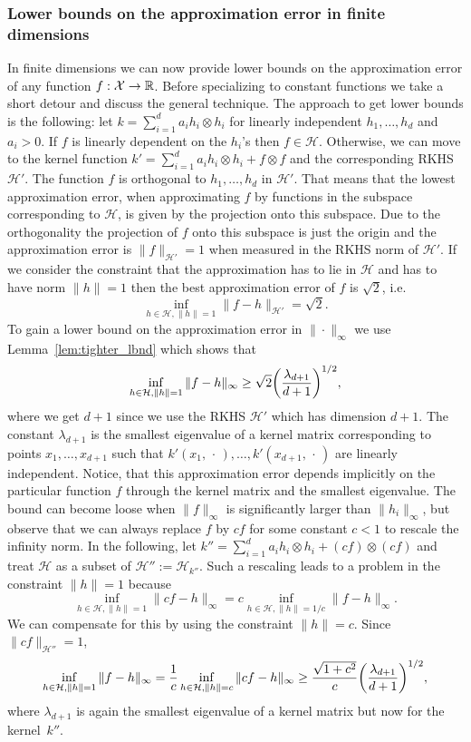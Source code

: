 \documentclass[AHL,Unicode,longabstracts,published]{cedram}
\theoremstyle{remark}
\newcommand{\R}{\mathbb{R}}
\newcommand{\X}{\mathcal{X}}
\newcommand{\cH}{\mathcal{H}}
\renewcommand*{\to}{\mathchoice{\longrightarrow}{\rightarrow}{\rightarrow}{\rightarrow}}
\let\originalleft\left
\let\originalright\right
\renewcommand{\left}{\mathopen{}\mathclose\bgroup\originalleft}
\renewcommand{\right}{\aftergroup\egroup\originalright}
\begin{document}
\subsubsection{Lower bounds on the approximation error in finite dimensions} \label{sec:finite_dim_appox_LB}
In finite dimensions we can now provide lower bounds on the approximation error of any function $f:\X \to \R$. Before specializing to constant functions we take a short detour and discuss the general technique. The approach to get lower bounds is the following: let $k = \sum_{i=1}^d a_i h_i \otimes h_i$ for linearly independent $h_1,\dots, h_d$ and $a_i>0$. If $f$ is linearly dependent on the $h_i$'s then $f \in \cH$. Otherwise, we can move to the kernel function $k' = \sum_{i=1}^d a_i h_i\otimes h_i + f\otimes f$ and the corresponding RKHS $\cH'$. The function $f$ is orthogonal to $h_1,\dots, h_d$ in $\cH'$. That means that the lowest approximation error, when approximating $f$ by functions in the subspace corresponding to $\cH$, is given by the projection onto this subspace. Due to the orthogonality the projection of $f$ onto this subspace is just the origin and the approximation error is $\|f\|_{\cH'} = 1$ when measured in the RKHS norm of $\cH'$. If we consider the constraint that the approximation has to lie in $\cH$ and has to have norm $\|h\| =1 $ then the best approximation error of $f$ is $\sqrt{2}$, i.e.
\[
\inf_{h \in \cH, \|h\|=1} \|f-h\|_{\cH'} = \sqrt{2}.
\]
To gain a lower bound on the approximation error in $\|\cdot\|_\infty$ we use Lemma~\ref{lem:tighter_lbnd} which shows that
\[
\inf_{h\in \cH, \|h\|=1} \|f-h\|_\infty \geq \sqrt{2} \left(\frac{\lambda_{d+1}}{d+1}\right)^{1/2},
\]
where we get $d+1$ since we use the RKHS $\cH'$ which has dimension $d+1$. The constant $\lambda_{d+1}$ is the smallest eigenvalue of a kernel matrix corresponding to points $x_1,\dots, x_{d+1}$ such that $k'(x_1,\,\cdot\,),\dots, k'(x_{d+1}, \,\cdot\,)$ are linearly independent. Notice, that this approximation error depends implicitly on the particular function $f$ through the kernel matrix and the smallest eigenvalue. The bound can become loose when $\|f\|_\infty$ is significantly larger than $\|h_i\|_\infty$, but observe that we can always replace $f$ by $cf$ for some constant $c<1$ to rescale the infinity norm. In the following, let $k'' = \sum_{i=1}^d a_i h_i\otimes h_i + (cf)\otimes (cf)$ and treat $\cH$ as a subset of $\cH'' := \cH_{k''}$. Such a rescaling leads to a problem in the constraint $\|h\|=1$ because
\[
\inf_{h\in \cH, \|h\|=1} \|cf-h\|_\infty = c \inf_{h\in \cH, \|h\|=1/c} \|f-h\|_\infty.
\]
We can compensate for this by using the constraint $\|h\| = c$. Since $\|cf\|_{\cH''} = 1$,
\[
\inf_{h\in \cH, \|h\|=1} \|f-h\|_\infty = \frac{1}{c} \inf_{h\in \cH, \|h\|=c} \|cf- h\|_\infty \geq \frac{\sqrt{1 + c^2}}{c} \left(\frac{\lambda_{d+1}}{d+1}\right)^{1/2},
\]
where $\lambda_{d+1}$ is again the smallest eigenvalue of a kernel matrix but now for the kernel~$k''$.
\end{document}
